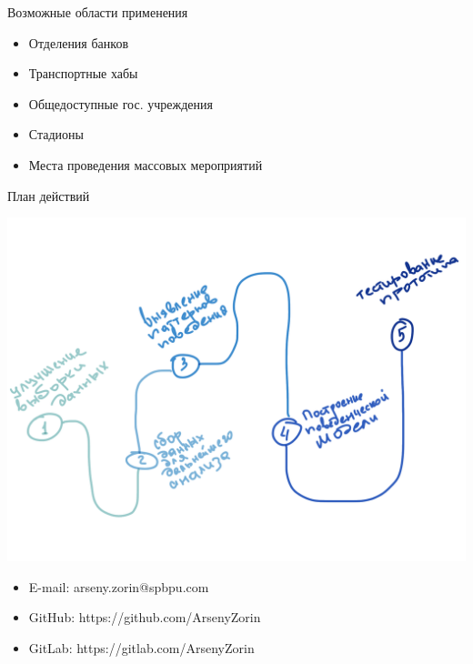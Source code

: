 \documentclass[
  russian,
  ignorenonframetext,
]{beamer}
\providecommand{\tightlist}{%
  \setlength{\itemsep}{0pt}\setlength{\parskip}{0pt}}
\begin{document}
\begin{frame}
\begin{block}{Возможные области применения}

\begin{itemize}
\tightlist
\item
  Отделения банков
\item
  Транспортные хабы
\item
  Общедоступные гос. учреждения
\item
  Стадионы
\item
  Места проведения массовых мероприятий
\end{itemize}

\end{block}

\begin{block}{План действий}

\begin{block}{}

\includegraphics{pics/roadmap.png}

\end{block}

\end{block}

\end{frame}

\begin{frame}{}
\protect\hypertarget{section-8}{}

\begin{itemize}
\tightlist
\item
  E-mail: arseny.zorin@spbpu.com
\item
  GitHub: https://github.com/ArsenyZorin
\item
  GitLab: https://gitlab.com/ArsenyZorin
\end{itemize}

\end{frame}
\end{document}
